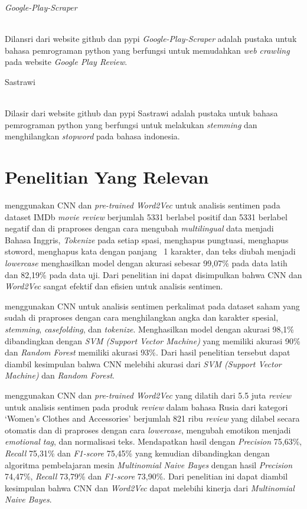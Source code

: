 \begin{itemize}
      {\bfseries \item \emph{Google-Play-Scraper}}\\
      Dilansri dari website github dan pypi \emph{Google-Play-Scraper} adalah pustaka untuk bahasa pemrograman
      python yang berfungsi untuk memudahkan \emph{web crawling} pada website \emph{Google Play Review}.

      {\bfseries \item Sastrawi}\\
      Dilasir dari website github dan pypi Sastrawi adalah pustaka untuk bahasa pemrograman python yang
      berfungsi untuk melakukan \emph{stemming} dan menghilangkan \emph{stopword} pada bahasa indonesia.

\end{itemize}

\section{Penelitian Yang Relevan}
\citet{Sharma2020} menggunakan CNN dan \emph{pre-trained Word2Vec} untuk analisis sentimen pada
dataset IMDb \emph{movie review} berjumlah 5331 berlabel positif dan 5331 berlabel negatif dan di
praproses dengan cara mengubah \emph{multilingual} data menjadi Bahasa Inggris, \emph{Tokenize} pada
setiap spasi, menghapus pungtuasi, menghapus stoword, menghapus kata dengan panjang \leq~1 karakter,
dan teks diubah menjadi \emph{lowercase} menghasilkan model dengan akurasi sebesar 99,07\% pada data
latih dan 82,19\% pada data uji. Dari penelitian ini dapat disimpulkan bahwa CNN dan \emph{Word2Vec}
sangat efektif dan efisien untuk analisis sentimen.

\citet{Dong2020} menggunakan CNN untuk analisis sentimen perkalimat pada dataset saham yang sudah
di praproses dengan cara menghilangkan angka dan karakter spesial, \emph{stemming}, \emph{casefolding},
dan \emph{tokenize}. Menghasilkan model dengan akurasi 98,1\% dibandingkan dengan \emph{SVM (Support Vector Machine)} yang
memiliki akurasi 90\% dan \emph{Random Forest} memiliki akurasi 93\%. Dari hasil penelitian tersebut
dapat diambil kesimpulan bahwa CNN melebihi akurasi dari \emph{SVM (Support Vector Machine)} dan
\emph{Random Forest}.

\citet{Smetanin2019} menggunakan CNN dan \emph{pre-trained Word2Vec} yang dilatih dari 5.5 juta \emph{review}
untuk analisis sentimen pada produk \emph{review} dalam bahasa Rusia dari kategori `Women's Clothes and Accessories'
berjumlah 821 ribu \emph{review} yang dilabel secara otomatis dan di praproses dengan cara \emph{lowercase},
mengubah emotikon menjadi \emph{emotional tag}, dan normalisasi teks. Mendapatkan hasil dengan
\emph{Precision} 75,63\%, \emph{Recall} 75,31\% dan \emph{F1-score} 75,45\% yang kemudian dibandingkan
dengan algoritma pembelajaran mesin \emph{Multinomial Naive Bayes} dengan hasil \emph{Precision} 74,47\%,
\emph{Recall} 73,79\% dan \emph{F1-score} 73,90\%. Dari penelitian ini dapat diambil kesimpulan
bahwa CNN dan \emph{Word2Vec} dapat melebihi kinerja dari \emph{Multinomial Naive Bayes}.

